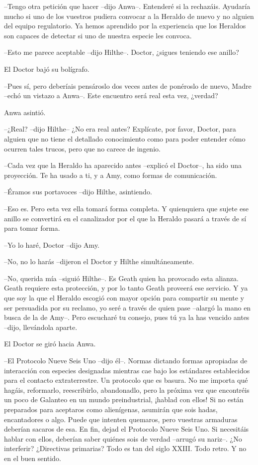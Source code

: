 {--Tengo otra petición que hacer --dijo Anwa--. Entenderé si la
	rechazáis. Ayudaría mucho si uno de los vuestros pudiera convocar a la
	Heraldo de nuevo y no alguien del equipo regulatorio. Ya hemos aprendido
	por la experiencia que los Heraldos son capaces de detectar si uno de
nuestra especie les convoca.}

{--Esto me parece aceptable --dijo Hilthe--. Doctor, ¿sigues teniendo
ese anillo?}

{El Doctor bajó su bolígrafo.}

{--Pues sí, pero deberíais pensároslo dos veces antes de ponéroslo de
	nuevo, Madre --echó un vistazo a Anwa--. Este encuentro será real esta
vez, ¿verdad?}

{Anwa asintió.}

{--¿Real? --dijo Hilthe-- ¿No era real antes? Explícate, por favor,
	Doctor, para alguien que no tiene el detallado conocimiento como para
	poder entender cómo ocurren tales trucos, pero que no carece de
ingenio.}

{--Cada vez que la Heraldo ha aparecido antes --explicó el Doctor--,
	ha sido una proyección. Te ha usado a ti, y a Amy, como formas de
comunicación.}

{--Éramos sus portavoces --dijo Hilthe, asintiendo.}

{--Eso es. Pero esta vez ella tomará forma completa. Y quienquiera que
	sujete ese anillo se convertirá en el canalizador por el que la Heraldo
pasará a través de sí para tomar forma.}

{--Yo lo haré, Doctor --dijo Amy.}

{--No, no lo harás --dijeron el Doctor y Hilthe simultáneamente.}

{--No, querida mía --siguió Hilthe--. Es Geath quien ha provocado esta
	alianza. Geath requiere esta protección, y por lo tanto Geath proveerá
	ese servicio. Y ya que soy la que el Heraldo escogió con mayor opción
	para compartir su mente y ser persuadida por su reclamo, yo seré a
	través de quien pase --alargó la mano en busca de la de Amy--. Pero
	escucharé tu consejo, pues tú ya la has vencido antes --dijo, llevándola
aparte.}

{El Doctor se giró hacia Anwa.}

{--El Protocolo Nueve Seis Uno --dijo él--. Normas dictando formas
	apropiadas de interacción con especies designadas mientras cae bajo los
	estándares establecidos para el contacto extraterrestre. Un protocolo
	que es basura. No me importa qué hagáis, reformarlo, reescribirlo,
	abandonadlo, pero la próxima vez que encontréis un poco de Galanteo en
	un mundo preindustrial, ¡hablad con ellos! Si no están preparados para
	aceptaros como alienígenas, asumirán que sois hadas, encantadores o
	algo. Puede que intenten quemaros, pero vuestras armaduras deberían
	sacaros de esa. En fin, dejad el Protocolo Nueve Seis Uno. Si necesitáis
	hablar con ellos, deberían saber quiénes sois de verdad --arrugó su
	nariz--. ¿No interferir? ¿Directivas primarias? Todo es tan del siglo
XXIII\@. Todo retro. Y no en el buen sentido.}

